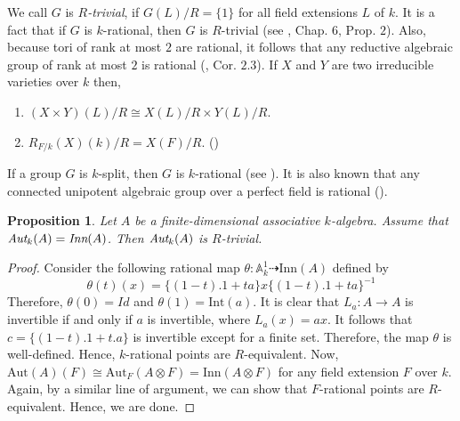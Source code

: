 \documentclass[12pt]{amsart}
\newtheorem{proposition}[theorem]{Proposition}
\theoremstyle{definition}
\numberwithin{equation}{section}
\begin{document}
\vskip2mm
\noindent
We call $G$ is \emph{$R$-trivial}, if $G(L)/R = \{1\}$ for all field extensions $L$ of $k$. It is a fact that if $G$ is $k$-rational, then $G$ is $R$-trivial (see
\cite{Voskrenskii}, Chap. $6$, Prop. $2$). Also, because tori of rank at most $2$ are rational, it follows that any reductive algebraic group of rank at most $2$ is rational (\cite{CM}, Cor. $2.3$). If $X$ and $Y$ are two irreducible varieties over $k$ then,
\begin{enumerate}
    \item $(X\times Y)(L)/R\cong X(L)/R\times Y(L)/R $.
    \vskip2mm
    \item $R_{F/k}(X)(k)/R=X(F)/R$.  (\cite{Voskrenskii})
\end{enumerate}

\vskip2mm
\noindent
If a group $G$ is $k$-split, then $G$ is $k$-rational (see \cite{VT}). It is also known that any connected unipotent algebraic group over a perfect field is rational (\cite{Voskrenskii}).

\vskip2mm
\begin{proposition}\label{Proposition 4.1}
Let $A$ be a finite-dimensional associative $k$-algebra. Assume that $\emph{\text{Aut}}_k(A)= \emph{Inn}(A)$. Then $\emph{\text{Aut}}_k(A)$ is $R$-trivial.
\end{proposition}

\vskip1mm
\begin{proof}
Consider the following rational map $\theta :\mathbb{A}^1_{k}\dashrightarrow \text{Inn}(A)$ defined by 
\begin{equation*}\label{eq4}
\theta(t)(x)=\{(1-t).1+ta\}x\{(1-t).1+ta\}^{-1}
\end{equation*}
\vskip1mm
\noindent
Therefore, $\theta(0)=Id$ and $\theta(1)=\text{Int}(a)$. It is clear that $L_a:A\rightarrow A$ is invertible if and only if $a$ is invertible, where $L_a(x)=ax$. 
It follows that $c=\{(1-t).1+t.a\}$ is invertible 
except for a finite set. Therefore, the map $\theta$ is well-defined. Hence, $k$-rational points are $R$-equivalent. Now, $\text{Aut}(A)(F)\cong \text{Aut}_F(A\otimes F)=\text{Inn}(A\otimes F)$ for any field extension $F$ over $k$. Again, by a similar line of argument, we can show that $F$-rational points are $R$-equivalent. Hence, we are done. 
\end{proof}
\end{document}
